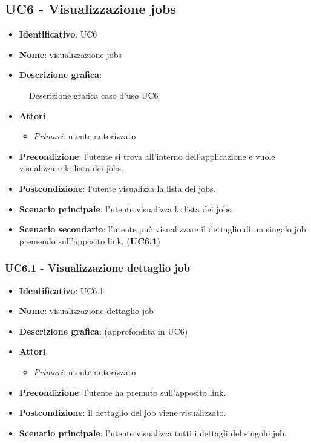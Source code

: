 
\subsection{UC6 - Visualizzazione jobs}
\begin{itemize}
  \item \textbf{Identificativo}: UC6
  \item \textbf{Nome}: visualizzazione jobs
  \item \textbf{Descrizione grafica}:
\end{itemize}

\begin{figure}[h]
  \centering
  \caption{Descrizione grafica caso d'uso UC6}
\end{figure}

\begin{itemize}
  \item \textbf{Attori}
        \begin{itemize}
          \item \textit{Primari}: utente autorizzato
        \end{itemize}
  \item \textbf{Precondizione}: l'utente si trova all'interno dell'applicazione e vuole visualizzare la lista dei jobs.
  \item \textbf{Postcondizione}: l'utente visualizza la lista dei jobs.
  \item \textbf{Scenario principale}: l'utente visualizza la lista dei jobs.
  \item \textbf{Scenario secondario}: l'utente può visualizzare il dettaglio di un singolo job premendo sull'apposito link. (\textbf{UC6.1})
\end{itemize}

\subsubsection{UC6.1 - Visualizzazione dettaglio job}
\begin{itemize}
  \item \textbf{Identificativo}: UC6.1
  \item \textbf{Nome}: visualizzazione dettaglio job
  \item \textbf{Descrizione grafica}: (approfondita in UC6)
  \item \textbf{Attori}
        \begin{itemize}
          \item \textit{Primari}: utente autorizzato
        \end{itemize}
  \item \textbf{Precondizione}: l'utente ha premuto sull'apposito link.
  \item \textbf{Postcondizione}: il dettaglio del job viene visualizzato.
  \item \textbf{Scenario principale}: l'utente visualizza tutti i dettagli del singolo job.
\end{itemize}